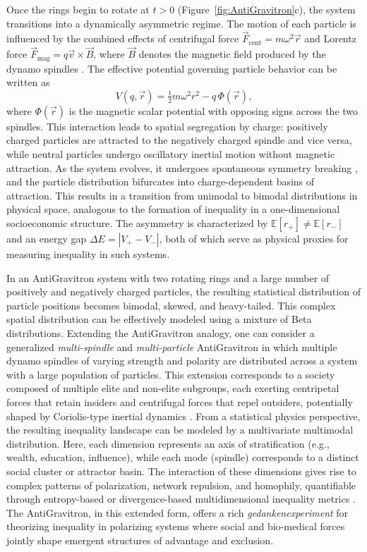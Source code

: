 \documentclass[11pt]{article}
\begin{document}
Once the rings begin to rotate at $t > 0$ (Figure~\ref{fig:AntiGravitron}c), the system transitions into a dynamically asymmetric regime. The motion of each particle is influenced by the combined effects of centrifugal force $\vec{F}_\mathrm{cent} = m\omega^2 \vec{r}$ and Lorentz force $\vec{F}_\mathrm{mag} = q\vec{v} \times \vec{B}$, where $\vec{B}$ denotes the magnetic field produced by the dynamo spindles \citep{moffatt1978magnetic}. The effective potential governing particle behavior can be written as
\[
V(q, \vec{r}) = \tfrac{1}{2} m \omega^2 r^2 - q \, \Phi(\vec{r}),
\]
where $\Phi(\vec{r})$ is the magnetic scalar potential with opposing signs across the two spindles. This interaction leads to spatial segregation by charge: positively charged particles are attracted to the negatively charged spindle and vice versa, while neutral particles undergo oscillatory inertial motion without magnetic attraction. As the system evolves, it undergoes spontaneous symmetry breaking \citep{anderson1972more}, and the particle distribution bifurcates into charge-dependent basins of attraction. This results in a transition from unimodal to bimodal distributions in physical space, analogous to the formation of inequality in a one-dimensional socioeconomic structure. The asymmetry is characterized by $\mathbb{E}[r_+] \neq \mathbb{E}[r_-]$ and an energy gap $\Delta E = |V_+ - V_-|$, both of which serve as physical proxies for measuring inequality in such systems.

In an AntiGravitron system with two rotating rings and a large number of positively and negatively charged particles, the resulting statistical distribution of particle positions becomes bimodal, skewed, and heavy-tailed. This complex spatial distribution can be effectively modeled using a mixture of Beta distributions. 
Extending the AntiGravitron analogy, one can consider a generalized \textit{multi-spindle} and \textit{multi-particle} AntiGravitron in which multiple dynamo spindles of varying strength and polarity are distributed across a system with a large population of particles. This extension corresponds to a society composed of multiple elite and non-elite subgroups, each exerting centripetal forces that retain insiders and centrifugal forces that repel outsiders, potentially shaped by Coriolis-type inertial dynamics \citep{vallis2017atmospheric}. From a statistical physics perspective, the resulting inequality landscape can be modeled by a multivariate multimodal distribution. Here, each dimension represents an axis of stratification (e.g., wealth, education, influence), while each mode (spindle) corresponds to a distinct social cluster or attractor basin. The interaction of these dimensions gives rise to complex patterns of polarization, network repulsion, and homophily, quantifiable through entropy-based or divergence-based multidimensional inequality metrics \citep{cowan1996nonequilibrium, jones2015econophysics}. The AntiGravitron, in this extended form, offers a rich \textit{gedankenexperiment} for theorizing inequality in polarizing systems where social and bio-medical forces jointly shape emergent structures of advantage and exclusion.
\end{document}
